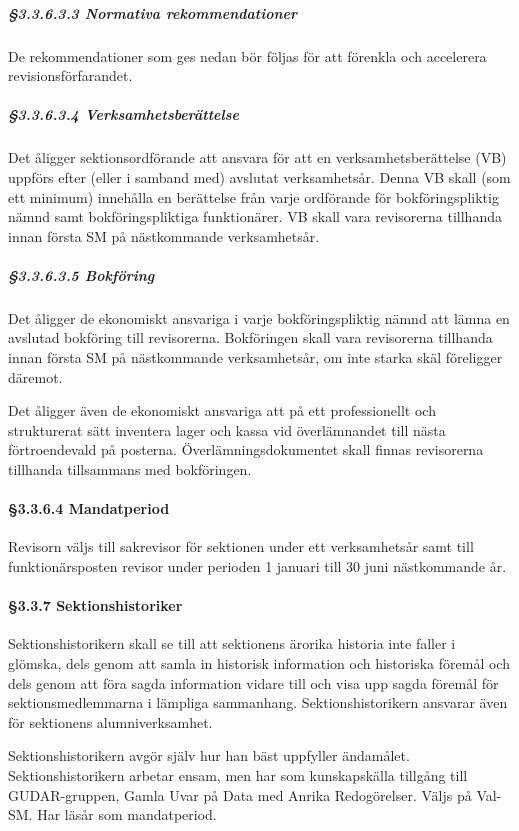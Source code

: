 \subparagraph{§3.3.6.3.3 Normativa rekommendationer}

De rekommendationer som ges nedan bör följas för att förenkla och accelerera revisionsförfarandet.

\subparagraph{§3.3.6.3.4 Verksamhetsberättelse}

Det åligger sektionsordförande att ansvara för att en verksamhetsberättelse (VB) uppförs efter (eller i samband med) avslutat verksamhetsår. Denna VB skall (som ett minimum) innehålla en berättelse från varje ordförande för bokföringspliktig nämnd samt bokföringspliktiga funktionärer. VB skall vara revisorerna tillhanda innan första SM på nästkommande verksamhetsår.

\subparagraph{§3.3.6.3.5 Bokföring}

Det åligger de ekonomiskt ansvariga i varje bokföringspliktig nämnd att lämna en avslutad bokföring till revisorerna. Bokföringen skall vara revisorerna tillhanda innan första SM på nästkommande verksamhetsår, om inte starka skäl föreligger däremot.

Det åligger även de ekonomiskt ansvariga att på ett professionellt och strukturerat sätt inventera lager och kassa vid överlämnandet till nästa förtroendevald på posterna. Överlämningsdokumentet skall finnas revisorerna tillhanda tillsammans med bokföringen.

\paragraph{§3.3.6.4 Mandatperiod}

Revisorn väljs till sakrevisor för sektionen under ett verksamhetsår samt till funktionärsposten revisor under perioden 1 januari till 30 juni nästkommande år.

\paragraph{§3.3.7 Sektionshistoriker}

Sektionshistorikern skall se till att sektionens ärorika historia inte faller i
glömska, dels genom att samla in historisk information och historiska föremål och dels genom att föra sagda information vidare till och visa upp sagda föremål för sektionsmedlemmarna i lämpliga sammanhang. Sektionshistorikern ansvarar även för sektionens alumniverksamhet.

Sektionshistorikern avgör själv hur han bäst uppfyller ändamålet. Sektionshistorikern arbetar ensam, men har som kunskapskälla tillgång till GUDAR-gruppen, Gamla Uvar på Data med Anrika Redogörelser. Väljs på Val-SM. Har läsår som mandatperiod.

